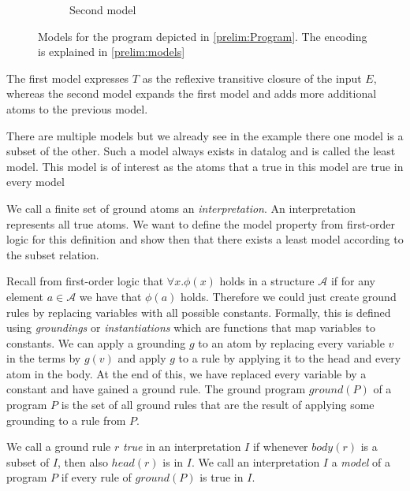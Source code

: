 \begin{contexample}
\begin{figure}
\begin{subfigure}{0.45\linewidth}
        \caption{Second model}
    \end{subfigure}
    \caption{Models for the program depicted in \cref{prelim:Program}. The encoding is explained in \cref{prelim:models}}
    \label{prelim:modelsPict}
    \end{figure}
    
    The first model expresses $T$ as the reflexive transitive closure of the input $E$, whereas the second model expands the first model and adds more additional atoms to the previous model.
\end{contexample}

There are multiple models but we already see in the example there one model is a subset of the other. Such a model always exists in datalog and is called the least model. This model is of interest as the atoms that a true in this model are true in every model

We call a finite set of ground atoms an \textit{interpretation}. An interpretation represents all true atoms. We want to define the model property from first-order logic for this definition and show then that there exists a least model according to the subset relation.

Recall from first-order logic that $\forall x. \phi(x)$ holds in a structure $\mathcal{A}$ if for any element $a \in \mathcal{A}$ we have that $\phi(a)$ holds. Therefore we could just create ground rules by replacing variables with all possible constants.
Formally, this is defined using \textit{groundings} or \textit{instantiations} which are functions that map variables to constants. We can apply a grounding $g$ to an atom by replacing every variable $v$ in the terms by $g(v)$ and apply $g$ to a rule by applying it to the head and every atom in the body. At the end of this, we have replaced every variable by a constant and have gained a ground rule. 
The ground program $ground(P)$ of a program $P$ is the set of all ground rules that are the result of applying some grounding to a rule from $P$.

We call a ground rule $r$ \textit{true} in an interpretation $I$ if whenever $body(r)$ is a subset of $I$, then also $head(r)$ is in $I$.  We call an interpretation $I$ a \textit{model} of a program $P$ if every rule of $ground(P)$ is true in $I$.

